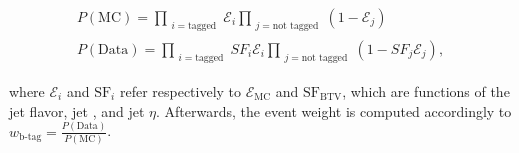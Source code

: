 \begin{refsection}
\begin{itemize}
    \begin{linenomath*}
    \begin{align}
    P(\text{MC}) = \prod_{\substack{i=\text{tagged}}} \mathcal{E}_i \prod_{\substack{j=\text{not tagged}}} (1 - \mathcal{E}_j) \\
    P(\text{Data}) = \prod_{\substack{i=\text{tagged}}} SF_i\mathcal{E}_i \prod_{\substack{j=\text{not tagged}}} (1 - SF_j\mathcal{E}_j),
    \end{align}
    \end{linenomath*}
    where $\mathcal{E}_i$ and $ \text{SF}_i $ refer respectively to $\mathcal{E}_{\text{MC}}$ and $\text{SF}_{\text{BTV}}$, which are functions of the jet flavor, jet \pT, and jet $\eta$. 
    Afterwards, the event weight is computed accordingly to $w_{\text{b-tag}} = \frac{P(\text{Data})}{P(\text{MC})}$.
    

\end{itemize}
\end{refsection}
